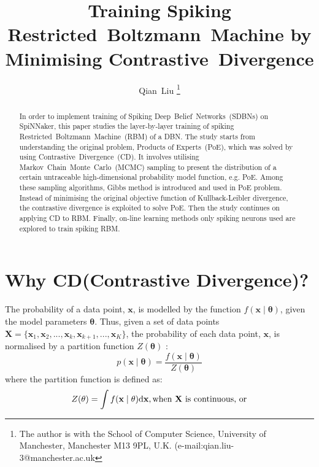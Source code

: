 \documentclass[11pt,twoside,a4paper]{article}
\def\D{\mathrm{d}}
\begin{document}
	\title{Training Spiking Restricted~Boltzmann~Machine by Minimising Contrastive~Divergence}
	\author{
	Qian~Liu
	\thanks{
	The author is with the School of Computer Science, University of Manchester, Manchester M13 9PL, U.K. 
	(e-mail:qian.liu-3@manchester.ac.uk}
	}
	\maketitle
	\thispagestyle{empty}

\begin{abstract}
	In order to implement training of Spiking Deep~Belief~Networks~(SDBNs) on SpiNNaker, this paper studies the layer-by-layer training of spiking Restricted~Boltzmann~Machine~(RBM) of a DBN.
	The study starts from understanding the original problem, Products of Experts~(PoE), which was solved by using Contrastive~Divergence~(CD).
	It involves utilising Markov~Chain~Monte~Carlo~(MCMC) sampling to present the distribution of a certain untraceable high-dimensional probability model function, e.g. PoE.
	Among these sampling algorithms, Gibbs method is introduced and used in PoE problem.
	Instead of minimising the original objective function of Kullback-Leibler divergence, the contrastive divergence is exploited to solve PoE.
	Then the study continues on applying CD to RBM.
	Finally, on-line learning methods only spiking neurons used are explored to train spiking RBM.
\end{abstract}

\section{Why CD(Contrastive Divergence)?\cite{hinton2002training,woodfordnotes}}
	The probability of a data point, $ \mathbf{x} $,  is modelled by the function $f(\mathbf{x} \mid \mathbf{\theta} )$, given the model parameters $ \mathbf{\theta} $. 
	Thus, given a set of data points $ \mathbf{X}=\{\mathbf{x}_1, \mathbf{x}_2, ..., \mathbf{x}_k, \mathbf{x}_{k+1}, ..., \mathbf{x}_K\} $, the probability of each data point,  $ \mathbf{x} $, is normalised by a partition function $Z( \mathbf{\theta})$ :
	\begin{equation}
	p(\mathbf{x} \mid \mathbf{\theta} ) = \dfrac{f(\mathbf{x} \mid \mathbf{\theta} )}{Z( \mathbf{\theta})}
	\end{equation}
	where the partition function is defined as:
	\begin{equation}
	\label{equ:z_int}
	Z( \mathbf{\theta}) = \int f(\mathbf{x} \mid \mathbf{\theta} )\D\mathbf{x}, \text{when  $ \mathbf{X} $ is continuous, or}
	\end{equation}
	
\end{document}
